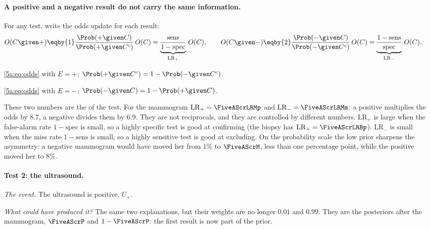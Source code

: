 \paragraph{A positive and a negative result do not carry the same information.}
For any test, write the odds update for each result:
\begin{align*}
  O(C\given +)
  &\eqby{1}\frac{\Prob(+\given C)}{\Prob(+\given C^c)}\,O(C)
   =\underbrace{\frac{\text{sens}}{1-\text{spec}}}_{\mathrm{LR}_+}\,O(C),
  \qquad
  O(C\given -)
  \eqby{2}\frac{\Prob(-\given C)}{\Prob(-\given C^c)}\,O(C)
   =\underbrace{\frac{1-\text{sens}}{\text{spec}}}_{\mathrm{LR}_-}\,O(C).
\end{align*}
\begin{explain}
  \item \eqref{5a:eq:odds} with $E=+$; $\Prob(+\given C^c)=1-\Prob(-\given C^c)$.
  \item \eqref{5a:eq:odds} with $E=-$; $\Prob(-\given C)=1-\Prob(+\given C)$.
\end{explain}
These two numbers are the  of the
test. For the mammogram $\mathrm{LR}_+=\FiveAScrLRMp$ and
$\mathrm{LR}_-=\FiveAScrLRMm$: a positive multiplies the odds by $8.7$, a negative
divides them by $6.9$. They are not reciprocals, and they are controlled by different
numbers. $\mathrm{LR}_+$ is large when the false-alarm rate $1-\text{spec}$ is small, so
a highly specific test is good at confirming (the biopsy has
$\mathrm{LR}_+=\FiveAScrLRBp$). $\mathrm{LR}_-$ is small when the miss rate
$1-\text{sens}$ is small, so a highly sensitive test is good at excluding. On the
probability scale the low prior sharpens the asymmetry: a negative mammogram would
have moved her from $1\%$ to $\FiveAScrM$, less than one percentage point, while the
positive moved her to $8\%$.

\paragraph{Test 2: the ultrasound.}
\emph{The event.} The ultrasound is positive, $U_+$.

\emph{What could have produced it?} The same two explanations, but their weights are
no longer $0.01$ and $0.99$. They are the posteriors after the mammogram,
$\FiveAScrP$ and $1-\FiveAScrP$: the first result is now part of the prior.


